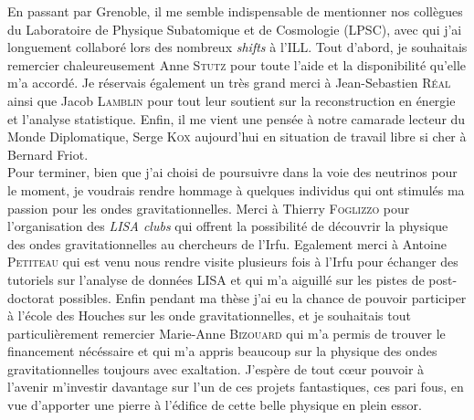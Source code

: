 En passant par Grenoble, il me semble indispensable de mentionner nos collègues du Laboratoire de Physique Subatomique et de Cosmologie (LPSC), avec qui j'ai longuement collaboré lors des nombreux \textit{shifts} à l'ILL. Tout d'abord, je souhaitais remercier chaleureusement Anne \textsc{Stutz} pour toute l'aide et la disponibilité qu'elle m'a accordé. Je réservais également un très grand merci à Jean-Sebastien \textsc{Réal} ainsi que Jacob \textsc{Lamblin} pour tout leur soutient sur la reconstruction en énergie et l'analyse statistique. Enfin, il me vient une pensée à notre camarade lecteur du Monde Diplomatique, Serge \textsc{Kox} aujourd'hui en situation de travail \og libre \fg{} si cher à Bernard Friot.\\

Pour terminer, bien que j'ai choisi de poursuivre dans la voie des neutrinos pour le moment, je voudrais rendre hommage à quelques individus qui ont stimulés ma passion pour les ondes gravitationnelles. Merci à Thierry \textsc{Foglizzo} pour l'organisation des \textit{LISA clubs} qui offrent la possibilité de découvrir la physique des ondes gravitationnelles au chercheurs de l'Irfu. Egalement merci à Antoine \textsc{Petiteau} qui est venu nous rendre visite plusieurs fois à l'Irfu pour échanger des tutoriels sur l'analyse de données LISA et qui m'a aiguillé sur les pistes de post-doctorat possibles. Enfin pendant ma thèse j'ai eu la chance de pouvoir participer à l'école des Houches sur les onde gravitationnelles, et je souhaitais tout particulièrement remercier Marie-Anne \textsc{Bizouard} qui m'a permis de trouver le financement nécéssaire et qui m'a appris beaucoup sur la physique des ondes gravitationnelles toujours avec exaltation. J'espère de tout c\oe ur pouvoir à l'avenir m'investir davantage sur l'un de ces projets fantastiques, ces pari fous, en vue d'apporter une pierre à l'édifice de cette belle physique en plein essor.\\















